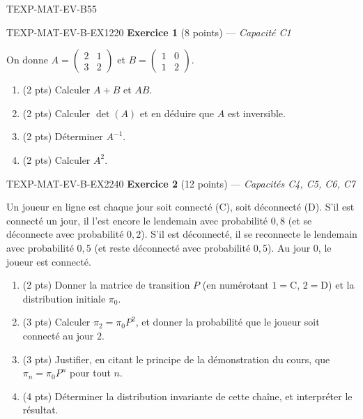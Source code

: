 \begin{evaluation}{TEXP-MAT-EV-B}{55}

\begin{exercice}{TEXP-MAT-EV-B-EX1}{2}{20}
\textbf{Exercice 1} (8 points) --- \textit{Capacité C1}

\medskip

On donne $A=\begin{pmatrix}2&1\\3&2\end{pmatrix}$ et $B=\begin{pmatrix}1&0\\1&2\end{pmatrix}$.

\begin{enumerate}
  \item (2 pts) Calculer $A+B$ et $AB$.
  \item (2 pts) Calculer $\det(A)$ et en déduire que $A$ est inversible.
  \item (2 pts) Déterminer $A^{-1}$.
  \item (2 pts) Calculer $A^2$.
\end{enumerate}
\end{exercice}

\begin{exercice}{TEXP-MAT-EV-B-EX2}{2}{40}
\textbf{Exercice 2} (12 points) --- \textit{Capacités C4, C5, C6, C7}

\medskip

Un joueur en ligne est chaque jour soit connecté (C), soit déconnecté (D). S'il est connecté un jour, il l'est encore le lendemain avec probabilité $0{,}8$ (et se déconnecte avec probabilité $0{,}2$). S'il est déconnecté, il se reconnecte le lendemain avec probabilité $0{,}5$ (et reste déconnecté avec probabilité $0{,}5$). Au jour $0$, le joueur est connecté.

\begin{enumerate}
  \item (2 pts) Donner la matrice de transition $P$ (en numérotant $1=$C, $2=$D) et la distribution initiale $\pi_0$.
  \item (3 pts) Calculer $\pi_2=\pi_0P^2$, et donner la probabilité que le joueur soit connecté au jour $2$.
  \item (3 pts) Justifier, en citant le principe de la démonstration du cours, que $\pi_n=\pi_0P^n$ pour tout $n$.
  \item (4 pts) Déterminer la distribution invariante de cette chaîne, et interpréter le résultat.
\end{enumerate}
\end{exercice}

\end{evaluation}
